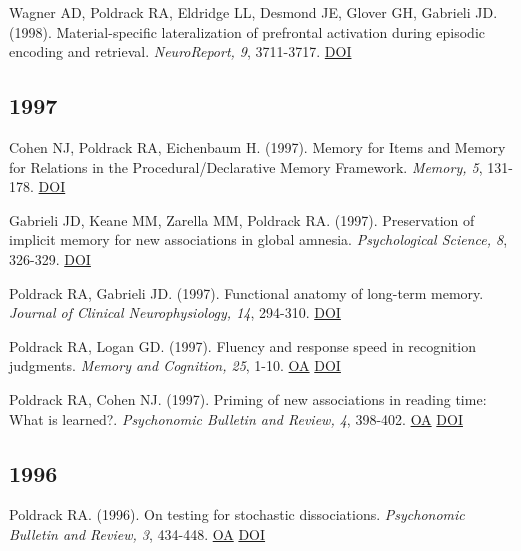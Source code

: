 \documentclass[10pt, letterpaper]{article}
\begin{document}
Wagner AD, Poldrack RA, Eldridge LL, Desmond JE, Glover GH, Gabrieli JD.  (1998). Material-specific lateralization of prefrontal activation during episodic encoding and retrieval. \textit{NeuroReport, 9}, 3711-3717. \href{https://doi.org/10.1097/00001756-199811160-00026}{DOI} \vspace{2mm}

\subsection*{1997}Cohen NJ, Poldrack RA, Eichenbaum H.  (1997). Memory for Items and Memory for Relations in the Procedural/Declarative Memory Framework. \textit{Memory, 5}, 131-178. \href{https://doi.org/10.1080/741941149}{DOI} \vspace{2mm}

Gabrieli JD, Keane MM, Zarella MM, Poldrack RA.  (1997). Preservation of implicit memory for new associations in global amnesia. \textit{Psychological Science, 8}, 326-329. \href{https://doi.org/10.1111/j.1467-9280.1997.tb00447.x}{DOI} \vspace{2mm}

Poldrack RA, Gabrieli JD.  (1997). Functional anatomy of long-term memory. \textit{Journal of Clinical Neurophysiology, 14}, 294-310. \href{https://doi.org/10.1097/00004691-199707000-00003}{DOI} \vspace{2mm}

Poldrack RA, Logan GD.  (1997). Fluency and response speed in recognition judgments. \textit{Memory and Cognition, 25}, 1-10. \href{https://doi.org/10.3758/bf03197280}{OA} \href{https://doi.org/10.3758/bf03197280}{DOI} \vspace{2mm}

Poldrack RA, Cohen NJ.  (1997). Priming of new associations in reading time: What is learned?. \textit{Psychonomic Bulletin and Review, 4}, 398-402. \href{https://doi.org/10.3758/bf03210800}{OA} \href{https://doi.org/10.3758/bf03210800}{DOI} \vspace{2mm}

\subsection*{1996}Poldrack RA.  (1996). On testing for stochastic dissociations. \textit{Psychonomic Bulletin and Review, 3}, 434-448. \href{https://doi.org/10.3758/bf03214547}{OA} \href{https://doi.org/10.3758/bf03214547}{DOI} \vspace{2mm}
\end{document}
